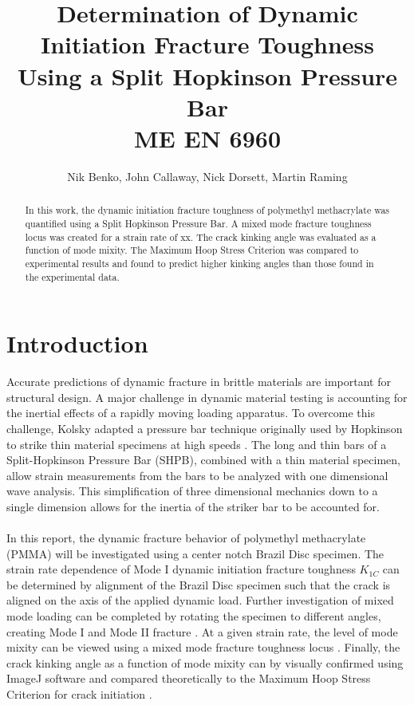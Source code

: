 \documentclass[12pt]{article}
\begin{document}
\title{ Determination of Dynamic Initiation Fracture Toughness Using a Split Hopkinson Pressure Bar  \\ \normalsize{ME EN 6960}}
\author{Nik Benko, John Callaway, Nick Dorsett, Martin Raming}
\maketitle

\begin{abstract} 
In this work, the dynamic initiation fracture toughness of polymethyl methacrylate was quantified using a Split Hopkinson Pressure Bar. A mixed mode fracture toughness locus was created for a strain rate of xx. The crack kinking angle was evaluated as a function of mode mixity. The Maximum Hoop Stress Criterion was compared to experimental results and found to predict higher kinking angles than those found in the experimental data.
\end{abstract}

\section{Introduction} %

Accurate predictions of dynamic fracture in brittle materials are important for structural design. A major challenge in dynamic material testing is accounting for the inertial effects of a rapidly moving loading apparatus. To overcome this challenge, Kolsky adapted a pressure bar technique originally used by Hopkinson to strike thin material specimens at high speeds \cite{Kolsky}. The long and thin bars of a Split-Hopkinson Pressure Bar (SHPB), combined with a thin material specimen, allow strain measurements from the bars to be analyzed with one dimensional wave analysis. This simplification of three dimensional mechanics down to a single dimension allows for the inertia of the striker bar to be accounted for.
\\ \\
In this report, the dynamic fracture behavior of polymethyl methacrylate (PMMA) will be investigated using a center notch Brazil Disc specimen. The strain rate dependence of Mode I dynamic initiation fracture toughness $K_{1C}$ can be determined by alignment of the Brazil Disc specimen such that the crack is aligned on the axis of the applied dynamic load. Further investigation of mixed mode loading can be completed by rotating the specimen to different angles, creating Mode I and Mode II fracture \cite{Atkinson} \cite{Shetty}. At a given strain rate, the level of mode mixity can be viewed using a mixed mode fracture toughness locus \cite{Nakano}. Finally, the crack kinking angle as a function of mode mixity can by visually confirmed using ImageJ software and compared theoretically to the Maximum Hoop Stress Criterion for crack initiation \cite{Meggiolaro}.  
 
\end{document}
